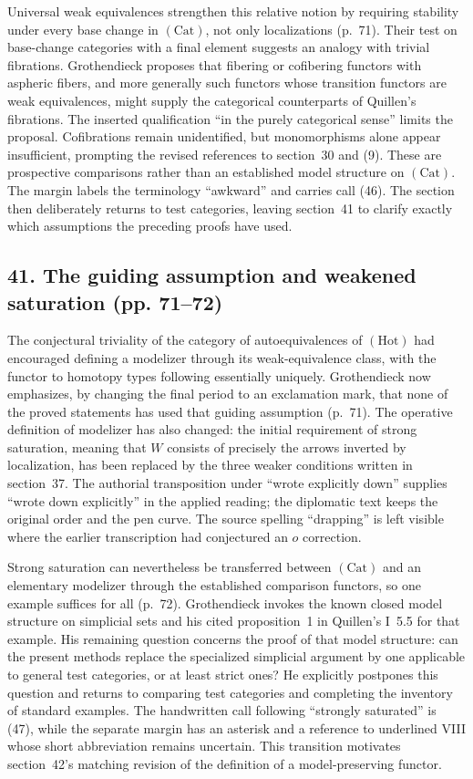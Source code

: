 Universal weak equivalences strengthen this relative notion by requiring stability under every base change in $(\mathrm{Cat})$, not only localizations (p.~71). Their test on base-change categories with a final element suggests an analogy with trivial fibrations. Grothendieck proposes that fibering or cofibering functors with aspheric fibers, and more generally such functors whose transition functors are weak equivalences, might supply the categorical counterparts of Quillen's fibrations. The inserted qualification ``in the purely categorical sense'' limits the proposal. Cofibrations remain unidentified, but monomorphisms alone appear insufficient, prompting the revised references to section~30 and (9). These are prospective comparisons rather than an established model structure on $(\mathrm{Cat})$. The margin labels the terminology ``awkward'' and carries call (46). The section then deliberately returns to test categories, leaving section~41 to clarify exactly which assumptions the preceding proofs have used.

\subsection*{41. The guiding assumption and weakened saturation (pp. 71--72)}
The conjectural triviality of the category of autoequivalences of $(\mathrm{Hot})$ had encouraged defining a modelizer through its weak-equivalence class, with the functor to homotopy types following essentially uniquely. Grothendieck now emphasizes, by changing the final period to an exclamation mark, that none of the proved statements has used that guiding assumption (p.~71). The operative definition of modelizer has also changed: the initial requirement of strong saturation, meaning that $W$ consists of precisely the arrows inverted by localization, has been replaced by the three weaker conditions written in section~37. The authorial transposition under ``wrote explicitly down'' supplies ``wrote down explicitly'' in the applied reading; the diplomatic text keeps the original order and the pen curve. The source spelling ``drapping'' is left visible where the earlier transcription had conjectured an $o$ correction.

Strong saturation can nevertheless be transferred between $(\mathrm{Cat})$ and an elementary modelizer through the established comparison functors, so one example suffices for all (p.~72). Grothendieck invokes the known closed model structure on simplicial sets and his cited proposition~1 in Quillen's I~5.5 for that example. His remaining question concerns the proof of that model structure: can the present methods replace the specialized simplicial argument by one applicable to general test categories, or at least strict ones? He explicitly postpones this question and returns to comparing test categories and completing the inventory of standard examples. The handwritten call following ``strongly saturated'' is (47), while the separate margin has an asterisk and a reference to underlined VIII whose short abbreviation remains uncertain. This transition motivates section~42's matching revision of the definition of a model-preserving functor.

